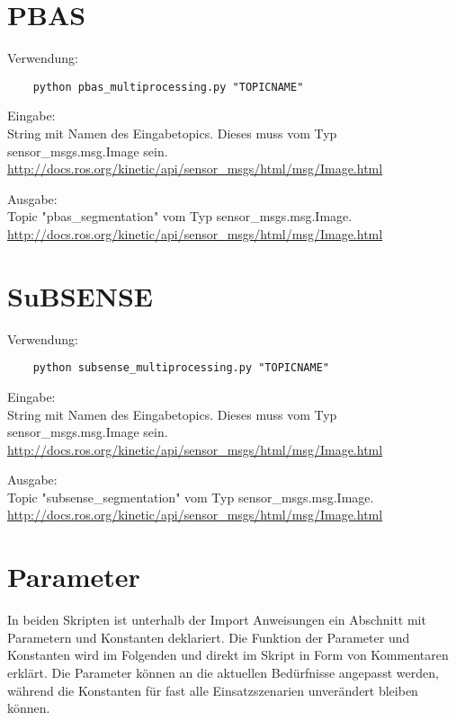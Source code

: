 \documentclass{article}
\begin{document}
	\section*{PBAS}
	Verwendung:
	\begin{lstlisting}
	python pbas_multiprocessing.py "TOPICNAME"
	\end{lstlisting}
	\vspace{1em}
	Eingabe: \\
	
	String mit Namen des Eingabetopics. Dieses muss vom Typ sensor\_msgs.msg.Image sein.\\
	\url{http://docs.ros.org/kinetic/api/sensor_msgs/html/msg/Image.html}
	\vspace{1em}
	\vspace{1em}
	
	Ausgabe: \\
	
	Topic "pbas\_segmentation" vom Typ sensor\_msgs.msg.Image.\\
	\url{http://docs.ros.org/kinetic/api/sensor_msgs/html/msg/Image.html}
	
	\section*{SuBSENSE}
	Verwendung:
	\begin{lstlisting}
	python subsense_multiprocessing.py "TOPICNAME"
	\end{lstlisting}
	\vspace{1em}
	Eingabe: \\
	
	String mit Namen des Eingabetopics. Dieses muss vom Typ sensor\_msgs.msg.Image sein.\\
	\url{http://docs.ros.org/kinetic/api/sensor_msgs/html/msg/Image.html}
	\vspace{1em}
	\vspace{1em}
	
	Ausgabe: \\
	
	Topic "subsense\_segmentation" vom Typ sensor\_msgs.msg.Image.\\
	\url{http://docs.ros.org/kinetic/api/sensor_msgs/html/msg/Image.html}

	\section*{Parameter}
	In beiden Skripten ist unterhalb der Import Anweisungen ein Abschnitt mit Parametern und Konstanten deklariert.
	Die Funktion der Parameter und Konstanten wird im Folgenden und direkt im Skript in Form von Kommentaren erkl\"art.
	Die Parameter k\"onnen an die aktuellen Bed\"urfnisse angepasst werden, während die Konstanten f\"ur fast alle Einsatzszenarien unver\"andert bleiben k\"onnen.
\end{document}
